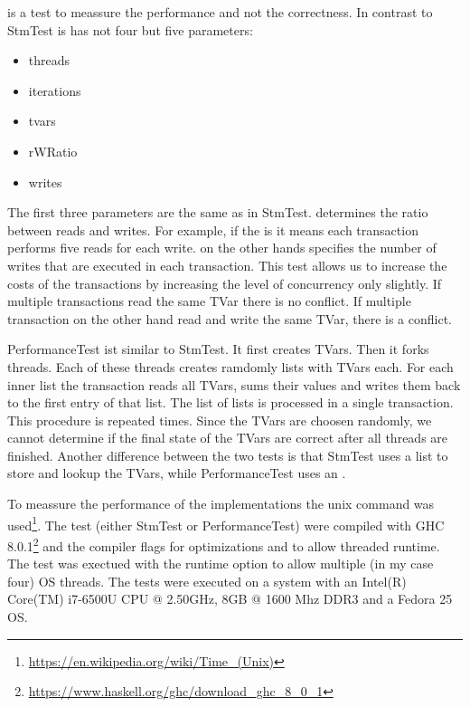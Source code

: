  is a test to meassure the performance and not the correctness. In contrast to StmTest is has not four but
five parameters:
\begin{itemize}
 \item threads
 \item iterations
 \item tvars
 \item rWRatio
 \item writes
\end{itemize}
The first three parameters are the same as in StmTest.  determines the ratio between reads and writes. For example, if
the  is  it means each transaction performs five reads for each write.  on the other hands specifies
the number of writes that are executed in each transaction. This test allows us to increase the costs of the transactions by 
increasing the level of concurrency only slightly. If multiple transactions read the same TVar there is no conflict. If multiple
transaction on the other hand read and write the same TVar, there is a conflict. 

PerformanceTest ist similar to StmTest. It first creates  TVars. Then it forks  threads. Each of these 
threads creates ramdomly  lists with  TVars each. For each inner list the transaction reads all TVars,
sums their values and writes them back to the first entry of that list. The list of lists is processed in a single transaction. 
This procedure is repeated  times. Since the TVars are choosen randomly, we cannot determine if the final state
of the TVars are correct after all threads are finished. Another difference between the two tests is that StmTest uses a list to 
store and lookup the TVars, while PerformanceTest uses an .

To meassure the performance of the implementations the unix  command was used\footnote{\url{https://en.wikipedia.org/wiki/Time_(Unix)}}.
The test (either StmTest or PerformanceTest) were compiled with GHC 8.0.1\footnote{\url{https://www.haskell.org/ghc/download_ghc_8_0_1}} and the 
compiler flags  for optimizations and  to allow threaded runtime. The test was exectued with the runtime option  
to allow multiple (in my case four) OS threads. The tests were executed on a system with an Intel(R) Core(TM) i7-6500U CPU @ 2.50GHz,
8GB @ 1600 Mhz DDR3 and a Fedora 25 OS. 


